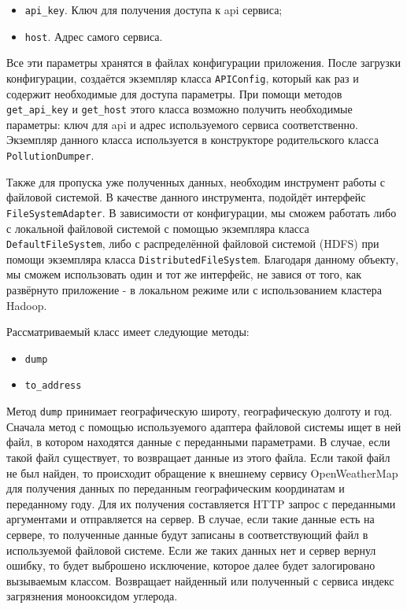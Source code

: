 \begin{itemize}
\item \texttt{api\_key}. Ключ для получения доступа к api сервиса;
\item \texttt{host}. Адрес самого сервиса.
\end{itemize}

Все эти параметры хранятся в файлах конфигурации приложения.
После загрузки конфигурации, создаётся экземпляр класса \texttt{APIConfig}, который как раз и содержит необходимые для доступа параметры.
При помощи методов \texttt{get\_api\_key} и \texttt{get\_host} этого класса возможно получить необходимые параметры: ключ для api и адрес используемого сервиса соответственно.
Экземпляр данного класса используется в конструкторе родительского класса \texttt{PollutionDumper}.

Также для пропуска уже полученных данных, необходим инструмент работы с файловой системой.
В качестве данного инструмента, подойдёт интерфейс \texttt{FileSystemAdapter}.
В зависимости от конфигурации, мы сможем работать либо с локальной файловой системой с помощью экземпляра класса \texttt{DefaultFileSystem}, либо с распределённой файловой системой (HDFS) при помощи экземпляра класса \texttt{DistributedFileSystem}.
Благодаря данному объекту, мы сможем использовать один и тот же интерфейс, не завися от того, как развёрнуто приложение - в локальном режиме или с использованием кластера Hadoop.

Рассматриваемый класс имеет следующие методы:
\begin{itemize}
\item \texttt{dump}
\item \texttt{to\_address}
\end{itemize}

Метод \texttt{dump} принимает географическую широту, географическую долготу и год.
Сначала метод с помощью используемого адаптера файловой системы ищет в ней файл, в котором находятся данные с переданными параметрами.
В случае, если такой файл существует, то возвращает данные из этого файла.
Если такой файл не был найден, то происходит обращение к внешнему сервису OpenWeatherMap для получения данных по переданным географическим координатам и переданному году.
Для их получения составляется HTTP запрос с переданными аргументами и отправляется на сервер.
В случае, если такие данные есть на сервере, то полученные данные будут записаны в соответствующий файл в используемой файловой системе.
Если же таких данных нет и сервер вернул ошибку, то будет выброшено исключение, которое далее будет залогировано вызываемым классом.
Возвращает найденный или полученный с сервиса индекс загрязнения монооксидом углерода.

